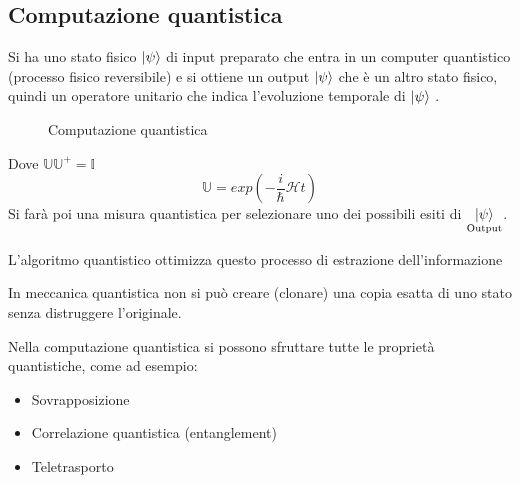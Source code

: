 \documentclass[a4paper]{article}
\begin{document}
\subsection{Computazione quantistica}
Si ha uno stato fisico \( \ket{\psi } \) di input preparato che entra in un computer
quantistico (processo fisico reversibile) e si ottiene un output \( \ket{\psi } \) che è un altro
stato fisico, quindi un operatore unitario che indica l'evoluzione temporale di \( \ket{\psi } \) .
\begin{figure}[H]
  \centering
  \caption{Computazione quantistica}
\end{figure}
\noindent
Dove \( \mathbb{U} \mathbb{U}^+ = \mathbb{I} \) 
\[
  \mathbb{U} = exp \left( -\frac{i}{\hslash} \mathcal{H} t \right)
\] 
Si farà poi una misura quantistica per selezionare uno dei possibili esiti di
\( \underset{\text{Output}}{\ket{\psi }} \).

\noindent
L'algoritmo quantistico ottimizza questo processo di estrazione dell'informazione

\begin{theorem}
  In meccanica quantistica non si può creare (clonare) una copia esatta di uno stato
  senza distruggere l'originale.
\end{theorem}

\vspace{1em}
\noindent
Nella computazione quantistica si possono sfruttare tutte le proprietà quantistiche,
come ad esempio:
\begin{itemize}
  \item Sovrapposizione
  \item Correlazione quantistica (entanglement)
  \item Teletrasporto
\end{itemize}
\end{document}
